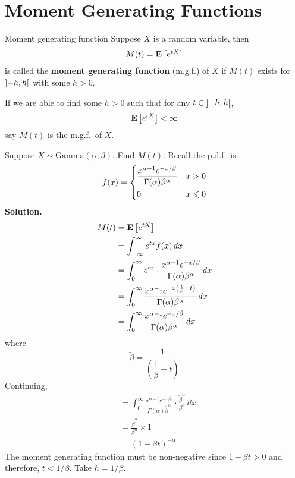 \section{Moment Generating Functions}
\begin{Definition}{Moment generating function}{}
    Suppose $ X $ is a random variable, then
    \[ M(t)=\bm{\mathrm{E}}\left[e^{tX}\right] \]
    is called the \textbf{moment generating function} (m.g.f.) of $ X $
    if $ M(t) $ exists for $ \interval[open]{-h}{h} $ with some $ h>0 $.
\end{Definition}
\begin{Remark}{}{}
    If we are able to find some $ h>0 $ such that for any
    $ t\in\interval[open]{-h}{h} $,
    \[ \bm{\mathrm{E}}\left[e^{tX}\right]<\infty \]
    say $ M(t) $ is the m.g.f.\ of $ X $.
\end{Remark}

\begin{Example}{}{}
    Suppose $ X \sim \text{Gamma}(\alpha,\beta) $. Find $ M(t) $.
    Recall the p.d.f.\ is
    \[ f(x)=\begin{dcases}
            \frac{x^{\alpha-1}e^{-x/\beta}}{\Gamma(\alpha)\beta^\alpha} & x>0          \\
            0                                                           & x\leqslant 0
        \end{dcases}
    \]
    \textbf{Solution.}
    \begin{align*}
        M(t)
         & =\bm{\mathrm{E}}\left[e^{tX}\right]                                                                                     \\
         & =\int_{-\infty}^{\infty} e^{tx}f(x)\, d{x}                                                      \\
         & =\int_{0}^{\infty} e^{tx}\cdot \frac{x^{\alpha-1}e^{-x/\beta}}{
        \Gamma(\alpha)\beta^\alpha
        } \, d{x}                                                                                          \\
         & =\int_{0}^{\infty} \frac{x^{\alpha-1}e^{-x\left( \frac{1}{\beta} -t \right)}}{
        \Gamma(\alpha)\beta^\alpha
        } \, d{x}                                                                                          \\
         & = \int_{0}^{\infty} \frac{x^{\alpha-1}e^{-x/\tilde{\beta}}}{\Gamma(\alpha)\beta^\alpha} \, d{x}
    \end{align*}
    where
    \[ \tilde{\beta}=\dfrac{1}{\left(\dfrac{1}{\beta}-t\right)}  \]
    Continuing,
    \begin{align*}
         & =\int_{0}^{\infty} \frac{x^{\alpha-1}e^{-x/\tilde{\beta}}}{\Gamma(\alpha)
        \tilde{\beta}^\alpha}\cdot \frac{\tilde{\beta}^\alpha}{\beta^\alpha}  \, d{x} \\
         & =\frac{\tilde{\beta}^\alpha}{\beta^\alpha} \times 1                        \\
         & =\left( 1-\beta t \right)^{-\alpha}
    \end{align*}
    The moment generating function must be non-negative since
    $ 1-\beta t>0 $ and therefore, $ t<1/\beta $. Take $ h=1/\beta $.
\end{Example}

